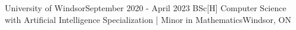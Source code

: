 \resumeSubheading
{University of Windsor}{September 2020 - April 2023}
{BSc[H] Computer Science with Artificial Intelligence Specialization | Minor in Mathematics}{Windsor, ON}
\resumeItemListStart
\resumeItemListEnd